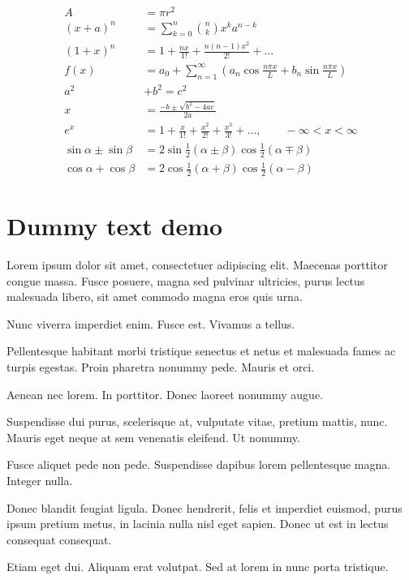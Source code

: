 \documentclass[letterpaper]{wordfeel}
\begin{document}
\begin{align}
    A&=\pi r^2 \\
    \left(x+a\right)^n&=\sum_{k=0}^{n}{\binom{n}{k}x^ka^{n-k}} \\
    \left(1+x\right)^n&=1+\frac{nx}{1!}+\frac{n\left(n-1\right)x^2}{2!}+\ldots \\
    f\left(x\right)&=a_0+\sum_{n=1}^{\infty}\left(a_n\cos{\frac{n\pi x}{L}}+b_n\sin{\frac{n\pi x}{L}}\right) \\
    a^2&+b^2=c^2 \\
    x&=\frac{-b\pm\sqrt{b^2-4ac}}{2a} \\
    e^x&=1+\frac{x}{1!}+\frac{x^2}{2!}+\frac{x^3}{3!}+\ldots, \hspace{2em}-\infty<x<\infty \\
    \sin{\alpha}\pm\sin{\beta}&=2\sin{\frac{1}{2}\left(\alpha\pm\beta\right)}\cos{\frac{1}{2}\left(\alpha\mp\beta\right)} \\
    \cos{\alpha}+\cos{\beta}&=2\cos{\frac{1}{2}\left(\alpha+\beta\right)}\cos{\frac{1}{2}\left(\alpha-\beta\right)}
\end{align}

\section{Dummy text demo}

Lorem ipsum dolor sit amet, consectetuer adipiscing elit. Maecenas porttitor congue massa. Fusce posuere, magna sed pulvinar ultricies, purus lectus malesuada libero, sit amet commodo magna eros quis urna.

Nunc viverra imperdiet enim. Fusce est. Vivamus a tellus.

Pellentesque habitant morbi tristique senectus et netus et malesuada fames ac turpis egestas. Proin pharetra nonummy pede. Mauris et orci.

Aenean nec lorem. In porttitor. Donec laoreet nonummy augue.

Suspendisse dui purus, scelerisque at, vulputate vitae, pretium mattis, nunc. Mauris eget neque at sem venenatis eleifend. Ut nonummy.

Fusce aliquet pede non pede. Suspendisse dapibus lorem pellentesque magna. Integer nulla.

Donec blandit feugiat ligula. Donec hendrerit, felis et imperdiet euismod, purus ipsum pretium metus, in lacinia nulla nisl eget sapien. Donec ut est in lectus consequat consequat.

Etiam eget dui. Aliquam erat volutpat. Sed at lorem in nunc porta tristique.
\end{document}
